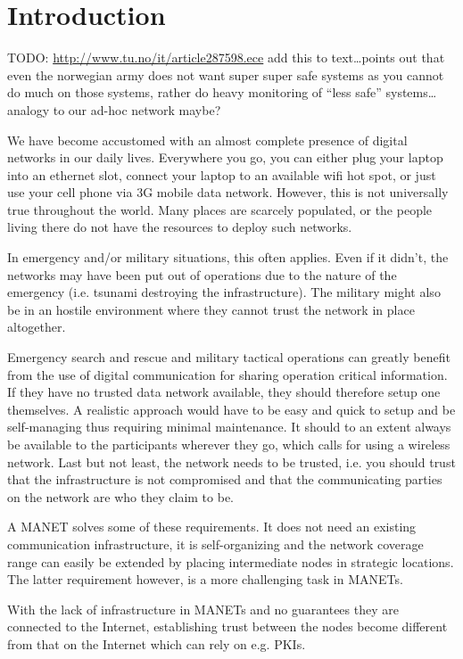 \chapter{Introduction}
\label{ch:intro}
\acresetall

TODO: \url{http://www.tu.no/it/article287598.ece} add this to text\ldots points
out that even the norwegian army does not want super super safe systems as you
cannot do much on those systems, rather do heavy monitoring of ``less safe''
systems\ldots analogy to our ad-hoc network maybe?

We have become accustomed with an almost complete presence of digital networks
in our daily lives. Everywhere you go, you can either plug your laptop into an
ethernet slot, connect your laptop to an available wifi hot spot, or just use
your cell phone via 3G mobile data network. However, this is not universally
true throughout the world. Many places are scarcely populated, or the people
living there do not have the resources to deploy such networks.

In emergency and/or military situations, this often applies. Even if it didn't,
the networks may have been put out of operations due to the nature of the
emergency (i.e. tsunami destroying the infrastructure). The military might
also be in an hostile environment where they cannot trust the network in place
altogether.

Emergency search and rescue and military tactical operations can greatly benefit
from the use of digital communication for sharing operation critical
information. If they have no trusted data network available, they should
therefore setup one themselves. A realistic approach would have to be easy and
quick to setup and be self-managing thus requiring minimal maintenance. It
should to an extent always be available to the participants wherever they go,
which calls for using a wireless network. Last but not least, the network needs
to be trusted, i.e. you should trust that the infrastructure is not compromised
and that the communicating parties on the network are who they claim to be.

A \ac{MANET} solves some of these requirements. It does not need an existing
communication infrastructure, it is self-organizing and the network coverage
range can easily be extended by placing intermediate nodes in strategic
locations. The latter requirement however, is a more challenging task in
\acp{MANET}.

With the lack of infrastructure in \acp{MANET} and no guarantees they are
connected to the Internet, establishing trust between the nodes become different
from that on the Internet which can rely on e.g. \acp{PKI}.

